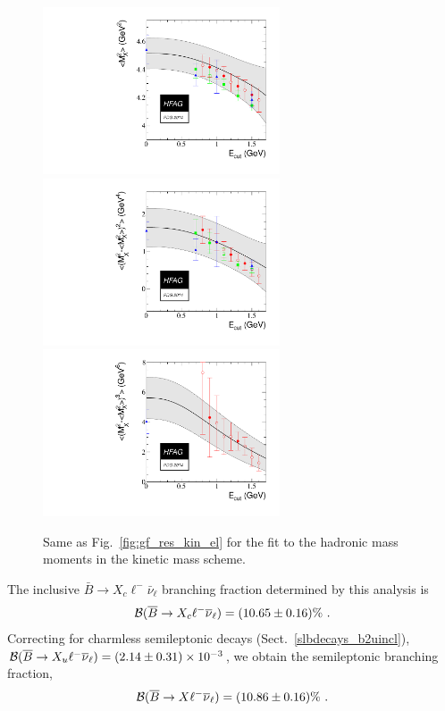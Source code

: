 \begin{figure}
\begin{center}
  \includegraphics[width=7cm]{figures/slb/h1_1.pdf}
  \includegraphics[width=7cm]{figures/slb/h2_1.pdf}\\
  \includegraphics[width=7cm]{figures/slb/h3_1.pdf}
\end{center}
\caption{Same as Fig.~\ref{fig:gf_res_kin_el} for the fit to the
  hadronic mass moments in the kinetic mass
  scheme.} \label{fig:gf_res_kin_mx}
\end{figure}

The inclusive $\bar B\to X_c\ell^-\bar\nu_\ell$ branching fraction
determined by this analysis is
\begin{equation}
  \cbf(\bar B\to X_c\ell^-\bar\nu_\ell)=(10.65\pm 0.16)\%~.
\end{equation}
Correcting for charmless semileptonic decays
(Sect.~\ref{slbdecays_b2uincl}), $\cbf(\bar B\to
X_u\ell^-\bar\nu_\ell)=(2.14\pm 0.31)\times 10^{-3}$, we obtain the
semileptonic branching fraction,
\begin{equation}
  \cbf(\bar B\to X\ell^-\bar\nu_\ell)=(10.86\pm 0.16)\%~.
\end{equation}

